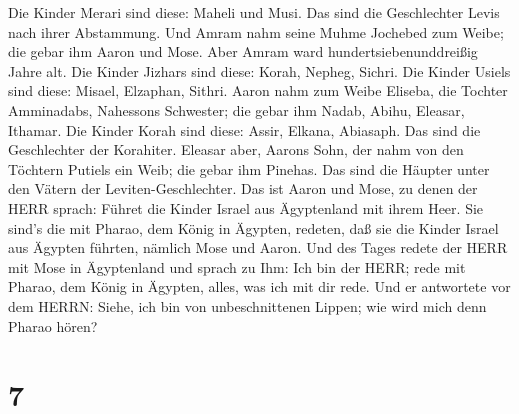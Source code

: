  Die Kinder Merari sind diese: Maheli und Musi. Das sind
die Geschlechter Levis nach ihrer Abstammung.  Und Amram
nahm seine Muhme Jochebed zum Weibe; die gebar ihm Aaron und Mose. Aber
Amram ward hundertsiebenunddreißig Jahre alt.  Die Kinder
Jizhars sind diese: Korah, Nepheg, Sichri.  Die Kinder
Usiels sind diese: Misael, Elzaphan, Sithri.  Aaron nahm
zum Weibe Eliseba, die Tochter Amminadabs, Nahessons Schwester; die
gebar ihm Nadab, Abihu, Eleasar, Ithamar.  Die Kinder Korah
sind diese: Assir, Elkana, Abiasaph. Das sind die Geschlechter der
Korahiter.  Eleasar aber, Aarons Sohn, der nahm von den
Töchtern Putiels ein Weib; die gebar ihm Pinehas. Das sind die Häupter
unter den Vätern der Leviten-Geschlechter.  Das ist Aaron
und Mose, zu denen der HERR sprach: Führet die Kinder Israel aus
Ägyptenland mit ihrem Heer.  Sie sind's die mit Pharao, dem
König in Ägypten, redeten, daß sie die Kinder Israel aus Ägypten
führten, nämlich Mose und Aaron.  Und des Tages redete der
HERR mit Mose in Ägyptenland  und sprach zu Ihm: Ich bin
der HERR; rede mit Pharao, dem König in Ägypten, alles, was ich mit dir
rede.  Und er antwortete vor dem HERRN: Siehe, ich bin von
unbeschnittenen Lippen; wie wird mich denn Pharao hören?

\hypertarget{section-6}{%
\section{7}\label{section-6}}

